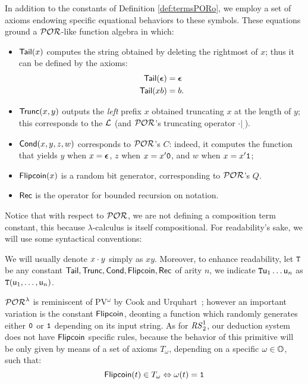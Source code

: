 {In addition to the constants of Definition \ref{def:termsPORo},
we employ a set of axioms
endowing specific equational behaviors to these symbols.
These equations ground a $\mathcal{POR}$-like function algebra
in which:
\begin{itemize}
  \item $\mathsf{Tail}(x)$ computes the string
  obtained by deleting
  {the rightmost of $x$}; thus it can be defined by the axioms:
  \begin{align*}
    \mathsf{Tail}(\bm{\epsilon}) &= \bm{\epsilon}\\
    \mathsf{Tail}(x b) &= b.
  \end{align*}
  \item $\mathsf{Trunc}(x,y)$
  outputs the \emph{left} prefix
  $x$ obtained truncating $x$ at the length of $y$;
  this corresponds to the $\mathcal{L}$ (and $\mathcal{POR}$'s truncating operator $\cdot|_\cdot$).
  \item $\mathsf{Cond}(x,y,z,w)$ corresponds to $\mathcal{POR}$'s $C$: indeed, it
  computes the function that
  yields $y$
  when $x=\bm{\epsilon}$,
  $z$ when $x=x'\mathtt{0}$, and
  $w$ when $x=x'\mathtt{1}$;
  \item $\mathsf{Flipcoin}(x)$ is a random bit
  generator, corresponding to $\mathcal{POR}$'s $Q$.
  \item $\mathsf{Rec}$
  is the operator for bounded recursion
  on notation.
\end{itemize}

Notice that with respect to $\mathcal{POR}$, we are not defining a composition term constant, this because
$\lambda$-calculus is itself compositional.
%
For readability's sake, we will use some syntactical conventions:

\begin{notation}
We will usually denote $x\cdot y$ simply
as $xy$.
Moreover, to enhance readability,
let $\mathtt{T}$ be any constant
$\mathsf{Tail}, \mathsf{Trunc}, \mathsf{Cond}, \mathsf{Flipcoin}, \mathsf{Rec}$
of arity $n$,
we indicate $\mathtt{T} {\mathsf u}_1\dots {\mathsf u}_n$
as $\mathtt{T}({\mathsf u}_1,\dots, {\mathsf u}_n)$.
\end{notation}


$\mathcal{POR}^\lambda$ is reminiscent of {PV$^\omega$}
by
Cook and Urquhart~\cite{CookUrquhart};
however an important variation is
the constant
$\mathsf{Flipcoin}$,
deonting a function
which
randomly generates either
{$\mathtt{0}$} or
{$\mathtt{1}$}
depending on its input string.
As for ${\mathit{RS}^1_2}$, our
deduction system does not have $\mathsf{Flipcoin}$ specific rules,
because the behavior of this primitive
will be only given by means of a set of axioms
$T_\omega$, depending on a specific $\omega \in \mathbb{O}$, such that:
$$
\mathsf{Flipcoin}(t)\in T_\omega \Leftrightarrow \omega(t)=\mathtt{1}
$$

}
